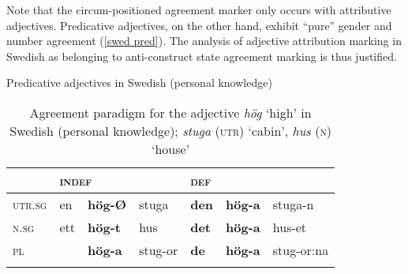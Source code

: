 Note that the circum-positioned agreement marker only occurs with attributive adjectives. Predicative adjectives, on the other hand, exhibit “pure” gender and number agreement (\ref{swed pred}). The analysis of adjective attribution marking in Swedish as belonging to anti\hyp{}construct state agreement marking is thus justified.
\begin{exe}
\label{swed pred}
\ex \rm{Predicative adjectives in Swedish (personal knowledge)}
\begin{xlist}
\end{xlist}
\end{exe}
\begin{table}
\begin{tabular}{l l l l l l l}
\lsptoprule
			&\multicolumn{3}{l}{\textsc{indef}}	&\multicolumn{3}{l}{\textsc{def}}\\
\midrule
\textsc{utr.sg}	&en	&\textbf{h{ö}g-Ø}&stuga		&\textbf{den}&\textbf{h{ö}g-a}&stuga-n\\

\textsc{n.sg}	&ett	&\textbf{h{ö}g-t}&hus		&\textbf{det}&\textbf{h{ö}g-a}&hus-et\\

\textsc{pl}		&	&\textbf{h{ö}g-a}&stug-or	&\textbf{de}&\textbf{h{ö}g-a}&stug-or:na\\
\lspbottomrule
\end{tabular}
\caption[Adjective paradigm for Swedish]{Agreement paradigm for the adjective \textit{hög} ‘high’ in Swedish (personal knowledge); \textit{stuga} (\textsc{utr}) ‘cabin’, \textit{hus} (\textsc{n}) ‘house’
}
\end{table}

